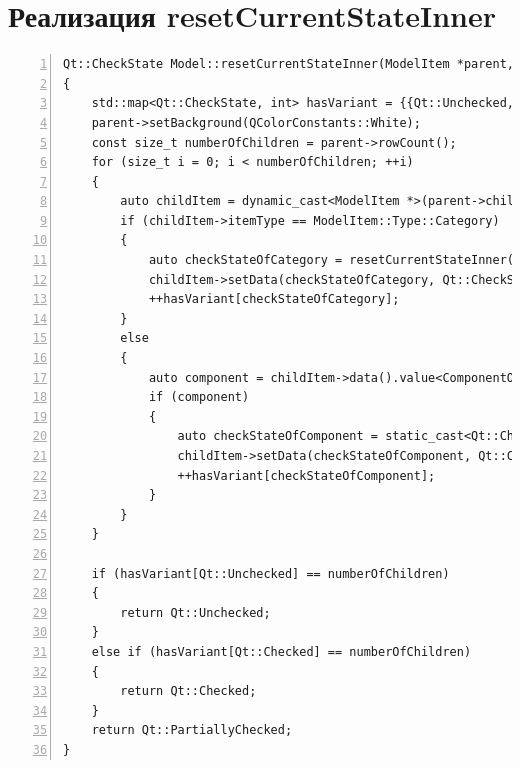 \documentclass[bachelor, och, pract]{SCWorks}
\begin{document}
\section{Реализация resetCurrentStateInner}\label{resetcurrentstateinner}

\begin{Verbatim}[fontsize=\small,breaklines=true,numbers=left]
Qt::CheckState Model::resetCurrentStateInner(ModelItem *parent, ComponentsState &state)
{
    std::map<Qt::CheckState, int> hasVariant = {{Qt::Unchecked, 0}, {Qt::PartiallyChecked, 0}, {Qt::Checked, 0}};
    parent->setBackground(QColorConstants::White);
    const size_t numberOfChildren = parent->rowCount();
    for (size_t i = 0; i < numberOfChildren; ++i)
    {
        auto childItem = dynamic_cast<ModelItem *>(parent->child(i));
        if (childItem->itemType == ModelItem::Type::Category)
        {
            auto checkStateOfCategory = resetCurrentStateInner(childItem, state);
            childItem->setData(checkStateOfCategory, Qt::CheckStateRole);
            ++hasVariant[checkStateOfCategory];
        }
        else
        {
            auto component = childItem->data().value<ComponentObject *>();
            if (component)
            {
                auto checkStateOfComponent = static_cast<Qt::CheckState>(state[component->m_id]); 
                childItem->setData(checkStateOfComponent, Qt::CheckStateRole);
                ++hasVariant[checkStateOfComponent];
            }
        }
    }

    if (hasVariant[Qt::Unchecked] == numberOfChildren)
    {
        return Qt::Unchecked;
    }
    else if (hasVariant[Qt::Checked] == numberOfChildren)
    {
        return Qt::Checked;
    }
    return Qt::PartiallyChecked;
}
\end{Verbatim}
\end{document}
